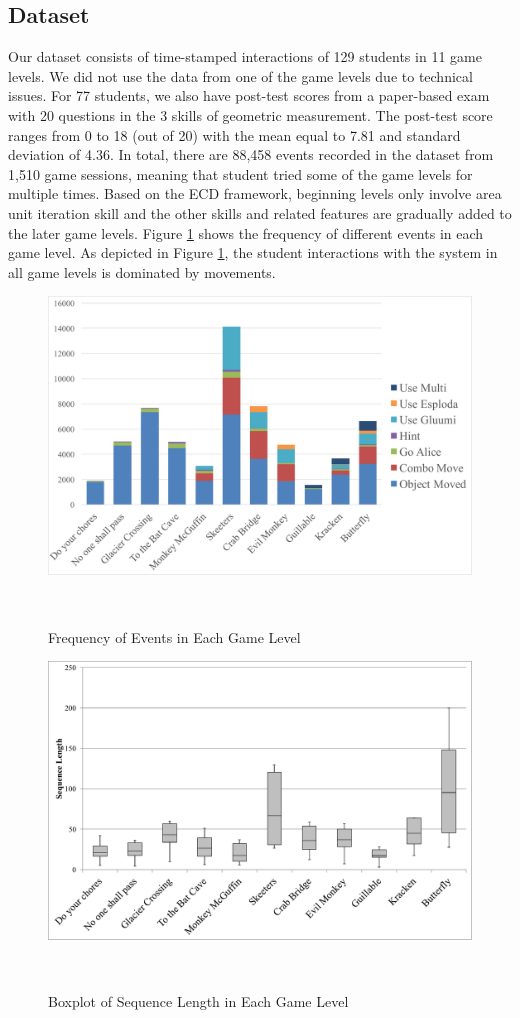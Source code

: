 \documentclass{sigchi}
\begin{document}
\subsection{Dataset} 
Our dataset consists of time-stamped interactions of 129 students in 11 game levels.
We did not use the data from one of the game levels due to technical issues.
For 77 students, we also have post-test scores from a paper-based exam with 20 questions in the 3 skills of geometric measurement.
The post-test score ranges from 0 to 18 (out of 20) with the mean equal to 7.81 and standard deviation of 4.36. 
In total, there are 88,458 events recorded in the dataset from 1,510 game sessions, meaning that student tried some of the game levels for multiple times.
Based on the ECD framework, beginning levels only involve area unit iteration skill and the other skills and related features are gradually added to the later game levels.
Figure \ref{fig:frequency} shows the frequency of different events in each game level. As depicted in Figure \ref{fig:frequency}, the student interactions with the system in all game levels is dominated by movements.

\begin{figure}
	\centering
	\includegraphics[width=0.9\columnwidth]{figures/frequency.pdf}
	\caption{Frequency of Events in Each Game Level}~\label{fig:frequency}
\end{figure}


\begin{figure}
	\centering
	\includegraphics[width=0.9\columnwidth]{figures/boxplot.pdf}
	\caption{Boxplot of Sequence Length in Each Game Level}~\label{fig:boxplot}
\end{figure}
\end{document}
